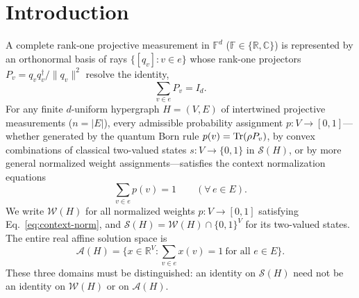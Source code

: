 \documentclass[aps,pra,reprint,superscriptaddress,longbibliography,nofootinbib,floatfix,10pt]{revtex4-2}
\theoremstyle{definition}\newtheorem{definition}[theorem]{Definition}
\theoremstyle{remark}\newtheorem{remark}[theorem]{Remark}
\newcommand{\C}{\mathbb C}\newcommand{\R}{\mathbb R}\newcommand{\Q}{\mathbb Q}
\newcommand{\F}{\mathbb F}\newcommand{\Z}{\mathbb Z}\newcommand{\PP}{\mathbb P}
\newcommand{\Sc}{\mathcal S}\newcommand{\Cc}{\mathcal C}\newcommand{\Wc}{\mathcal W}
\begin{document}
\section{Introduction}\label{sec:intro}

A complete rank-one projective measurement in $\F^d$ ($\F\in\{\R,\C\}$) is represented by an orthonormal basis of rays $\{[q_v]:v\in e\}$ whose rank-one projectors $P_v=q_v q_v^\dagger/\|q_v\|^2$ resolve the identity,
\begin{equation}\label{eq:projector-completeness}
\sum_{v\in e} P_v = I_d.
\end{equation}
For any finite $d$-uniform hypergraph $H=(V,E)$ of intertwined projective measurements ($n=|E|$), every admissible probability assignment $p:V\to[0,1]$---whether generated by the quantum Born rule $p(v)=\operatorname{Tr}(\rho P_v)$, by convex combinations of classical two-valued states $s:V\to\{0,1\}$ in $\Sc(H)$, or by more general normalized weight assignments---satisfies the context normalization equations
\begin{equation}\label{eq:context-norm}
\sum_{v\in e} p(v) = 1 \qquad (\forall\, e\in E).
\end{equation}
We write $\Wc(H)$ for all normalized weights $p:V\to[0,1]$ satisfying Eq.~\eqref{eq:context-norm}, and $\Sc(H)=\Wc(H)\cap\{0,1\}^{V}$ for its two-valued states. The entire real affine solution space is
\begin{equation}\label{eq:affine-weight-space}
\mathcal A(H)=\bigl\{x\in\R^{V}:\sum_{v\in e}x(v)=1\ \text{for all }e\in E\bigr\}.
\end{equation}
These three domains must be distinguished: an identity on $\Sc(H)$ need not be an identity on $\Wc(H)$ or on $\mathcal A(H)$.
\end{document}
